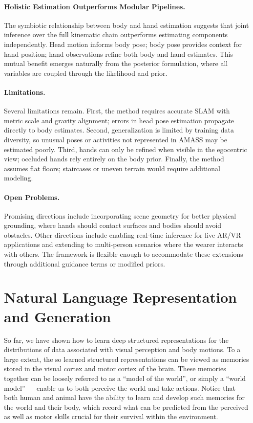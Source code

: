 \documentclass[../../book-main.tex]{subfiles}
\begin{document}
\paragraph{Holistic Estimation Outperforms Modular Pipelines.}
The symbiotic relationship between body and hand estimation suggests
that joint inference over the full kinematic chain outperforms
estimating components independently. Head motion informs body pose;
body pose provides context for hand position; hand observations
refine both body and hand estimates. This mutual benefit emerges
naturally from the posterior formulation, where all variables are
coupled through the likelihood and prior.

\paragraph{Limitations.}
Several limitations remain. First, the method requires accurate SLAM
with metric scale and gravity alignment; errors in head pose
estimation propagate directly to body estimates. Second,
generalization is limited by training data diversity, so unusual
poses or activities not represented in AMASS may be estimated poorly.
Third, hands can only be refined when visible in the egocentric view;
occluded hands rely entirely on the body prior. Finally, the method
assumes flat floors; staircases or uneven terrain would require
additional modeling.

\paragraph{Open Problems.}
Promising directions include incorporating scene geometry for better
physical grounding, where hands should contact surfaces and bodies
should avoid obstacles. Other directions include enabling real-time
inference for live AR/VR applications and extending to multi-person
scenarios where the wearer interacts with others. The framework is
flexible enough to accommodate these extensions through additional
guidance terms or modified priors.

\section{Natural Language Representation and Generation}\label{sec:clm_text}
So far, we have shown how to learn deep structured representations
for the distributions of data associated with visual perception and
body motions. To a large extent, the so learned structured
representations can be viewed as memories stored in the visual cortex
and motor cortex of the brain. These memories together can be loosely
referred to as a ``model of the world'', or simply a ``world model''
--- enable us to both perceive the world and take actions. Notice that
both human and animal have the ability to learn and develop such
memories for the world and their body, which record what can be
predicted from the perceived as well as motor skills crucial for
their survival within the environment.
\end{document}
